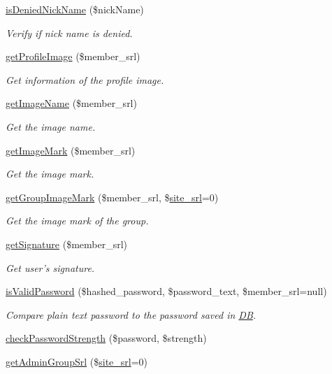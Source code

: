 \begin{DoxyCompactItemize}
\hyperlink{classmemberModel_a8d1d937176417d4d29a48404feb7f32f}{is\+Denied\+Nick\+Name} (\$nick\+Name)
\begin{DoxyCompactList}\small\item\em Verify if nick name is denied. \end{DoxyCompactList}\item 
\hyperlink{classmemberModel_af5bd1dffc3b3a613ecbb549ef1c980ac}{get\+Profile\+Image} (\$member\+\_\+srl)
\begin{DoxyCompactList}\small\item\em Get information of the profile image. \end{DoxyCompactList}\item 
\hyperlink{classmemberModel_a127758d897360c92484d27fcc6183254}{get\+Image\+Name} (\$member\+\_\+srl)
\begin{DoxyCompactList}\small\item\em Get the image name. \end{DoxyCompactList}\item 
\hyperlink{classmemberModel_a3c40e02685bba4add5cfbe95c7fae372}{get\+Image\+Mark} (\$member\+\_\+srl)
\begin{DoxyCompactList}\small\item\em Get the image mark. \end{DoxyCompactList}\item 
\hyperlink{classmemberModel_a0a4de94189c084493992feb8d7da5dcb}{get\+Group\+Image\+Mark} (\$member\+\_\+srl, \$\hyperlink{ko_8install_8php_a8b1406b4ad1048041558dce6bfe89004}{site\+\_\+srl}=0)
\begin{DoxyCompactList}\small\item\em Get the image mark of the group. \end{DoxyCompactList}\item 
\hyperlink{classmemberModel_a188af39a0460de37242d2df2651dc6e5}{get\+Signature} (\$member\+\_\+srl)
\begin{DoxyCompactList}\small\item\em Get user's signature. \end{DoxyCompactList}\item 
\hyperlink{classmemberModel_a5d2727323d47e4304998311424bb4091}{is\+Valid\+Password} (\$hashed\+\_\+password, \$password\+\_\+text, \$member\+\_\+srl=null)
\begin{DoxyCompactList}\small\item\em Compare plain text password to the password saved in \hyperlink{classDB}{D\+B}. \end{DoxyCompactList}\item 
\hyperlink{classmemberModel_a5970b2dcba76f9fc910cc3df7de19ac7}{check\+Password\+Strength} (\$password, \$strength)
\item 
\hyperlink{classmemberModel_ad8c1aafe9a4f461404b596ff6ad3e2ed}{get\+Admin\+Group\+Srl} (\$\hyperlink{ko_8install_8php_a8b1406b4ad1048041558dce6bfe89004}{site\+\_\+srl}=0)
\end{DoxyCompactItemize}
